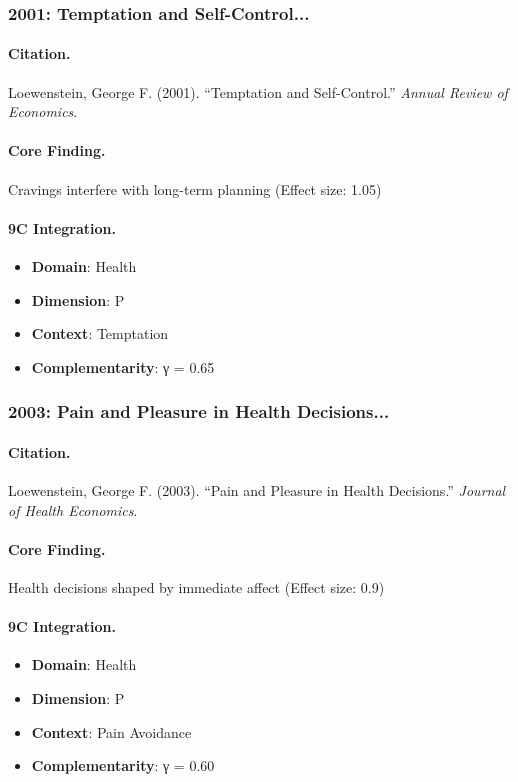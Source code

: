 \subsubsection{2001: Temptation and Self-Control...}

\paragraph{Citation.}
Loewenstein, George F. (2001). ``Temptation and Self-Control.''
\textit{Annual Review of Economics}.

\paragraph{Core Finding.}
Cravings interfere with long-term planning (Effect size: 1.05)

\paragraph{9C Integration.}
\begin{itemize}[nosep]
  \item \textbf{Domain}: Health
  \item \textbf{Dimension}: P
  \item \textbf{Context}: Temptation
  \item \textbf{Complementarity}: γ = 0.65
\end{itemize}

\subsubsection{2003: Pain and Pleasure in Health Decisions...}

\paragraph{Citation.}
Loewenstein, George F. (2003). ``Pain and Pleasure in Health Decisions.''
\textit{Journal of Health Economics}.

\paragraph{Core Finding.}
Health decisions shaped by immediate affect (Effect size: 0.9)

\paragraph{9C Integration.}
\begin{itemize}[nosep]
  \item \textbf{Domain}: Health
  \item \textbf{Dimension}: P
  \item \textbf{Context}: Pain Avoidance
  \item \textbf{Complementarity}: γ = 0.60
\end{itemize}

